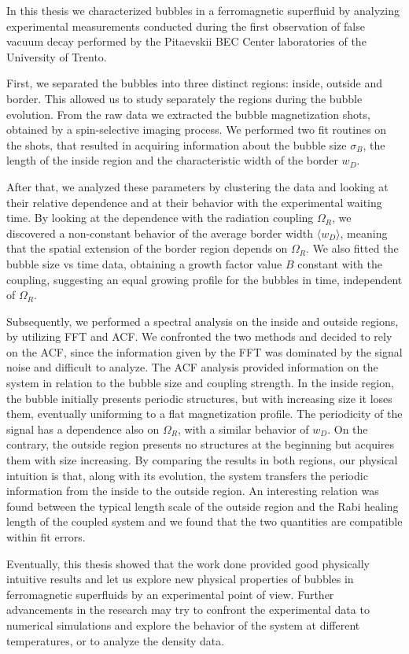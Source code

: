In this thesis we characterized bubbles in a ferromagnetic superfluid by analyzing experimental measurements conducted during the first observation of false vacuum decay performed by the Pitaevskii BEC Center laboratories of the University of Trento. 

First, we separated the bubbles into three distinct regions: inside, outside and border. This allowed us to study separately the regions during the bubble evolution. From the raw data we extracted the bubble magnetization shots, obtained by a spin-selective imaging process. We performed two fit routines on the shots, that resulted in acquiring information about the bubble size $\sigma_B$, the length of the inside region and the characteristic width of the border $w_D$. 

After that, we analyzed these parameters by clustering the data and looking at their relative dependence and at their behavior with the experimental waiting time. By looking at the dependence with the radiation coupling $\Omega_R$, we discovered a non-constant behavior of the average border width $\langle w_D\rangle$, meaning that the spatial extension of the border region depends on $\Omega_R$. We also fitted the bubble size vs time data, obtaining a growth factor value $B$ constant with the coupling, suggesting an equal growing profile for the bubbles in time, independent of $\Omega_R$.

Subsequently, we performed a spectral analysis on the inside and outside regions, by utilizing FFT and ACF. We confronted the two methods and decided to rely on the ACF, since the information given by the FFT was dominated by the signal noise and difficult to analyze. The ACF analysis provided information on the system in relation to the bubble size and coupling strength. In the inside region, the bubble initially presents periodic structures, but with increasing size it loses them, eventually uniforming to a flat magnetization profile. The periodicity of the signal has a dependence also on $\Omega_R$, with a similar behavior of $w_D$. On the contrary, the outside region presents no structures at the beginning but acquires them with size increasing. By comparing the results in both regions, our physical intuition is that, along with its evolution, the system transfers the periodic information from the inside to the outside region. An interesting relation was found between the typical length scale of the outside region and the Rabi healing length of the coupled system and we found that the two quantities are compatible within fit errors.

Eventually, this thesis showed that the work done provided good physically intuitive results and let us explore new physical properties of bubbles in ferromagnetic superfluids by an experimental point of view. Further advancements in the research may try to confront the experimental data to numerical simulations and explore the behavior of the system at different temperatures, or to analyze the density data.
